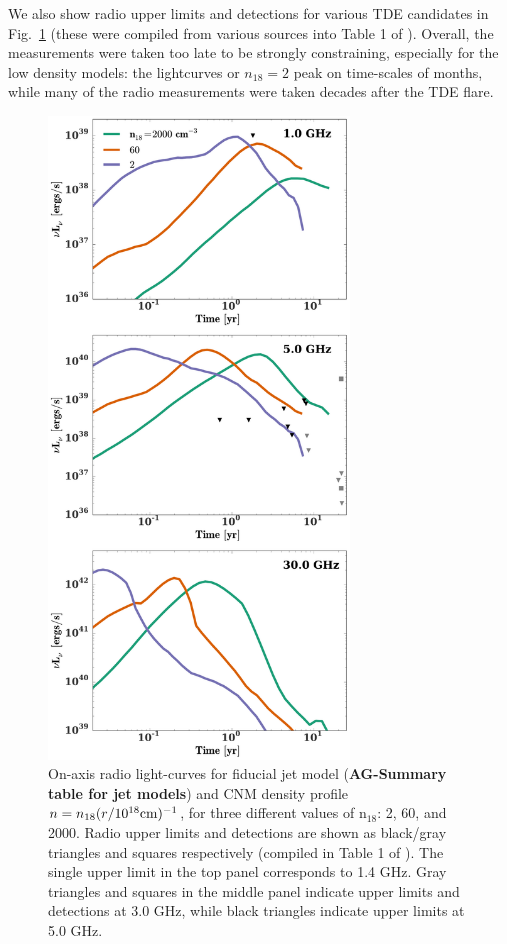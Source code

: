 \documentclass[usenatbib,fleqn]{mn2e}
\begin{document}
We also show radio upper limits and detections for various TDE
candidates in Fig.~\ref{fig:upper_limits} (these were compiled from
various sources into Table 1 of \citealt{Mimica+2015}). Overall, the
measurements were taken too late to be strongly constraining,
especially for the low density models: the lightcurves or $n_{18}=2$
peak on time-scales of months, while many of the radio measurements
were taken decades after the TDE flare.

\begin{figure} 
  \includegraphics[width=8cm]{lightcurves.pdf}
  \caption{\label{fig:upper_limits} On-axis radio light-curves for
    fiducial jet model ({\bf AG-Summary table for jet models}) and CNM
    density profile $n=n_{18} (r/10^{18} {\rm cm})^{-1}$, for three
    different values of n$_{18}$: 2, 60, and 2000. Radio upper limits
    and detections are shown as black/gray triangles and squares
    respectively (compiled in Table 1 of \citealt{Mimica+2015}). The
    single upper limit in the top panel corresponds to 1.4 GHz. Gray
    triangles and squares in the middle panel indicate upper limits
    and detections at 3.0 GHz, while black triangles indicate upper
    limits at 5.0 GHz.}
\end{figure}
\end{document}
